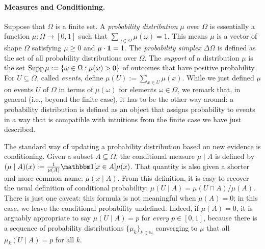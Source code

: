 \paragraph{Measures and Conditioning.}
Suppose that $\Omega$ is a finite set. 
A \emph{probability distribution} $\mu$ over $\Omega$ is essentially a function 
$\mu : \Omega \to [0,1]$ such that $\sum_{\omega \in \Omega} \mu(\omega) = 1$.
This means $\mu$ is a vector of shape 
$\Omega$ 
satisfying $\mu \ge 0$ and $\mu \cdot \mathbf 1 = 1$. 
The \emph{probability simplex} $\Delta \Omega$ is defined as the set of all probability distributions over $\Omega$. 
The \emph{support} of a distribution $\mu$
    is the set $\operatorname{\mathrm{Supp}} \mu := \{ \omega \in \Omega : \mu(\omega) > 0 \}$
    of outcomes that have positive probability.
For $U \subseteq \Omega$, called \emph{events},
    define $\mu(U) := \sum_{x \in U} \mu(x)$. 
While we just defined $\mu$ on events $U$ of $\Omega$ in terms of $\mu(\omega)$ for elements $\omega \in \Omega$, we remark that, in general (i.e., beyond the finite case), it has to be the other way around: 
a probability distribution is defined as an object that assigns probability to events in a way that is compatible with intuitions from the finite case we have just described.


The standard way of updating a probability distribution based on new evidence is conditioning.
Given a subset $A \subseteq \Omega$, the conditional measure
$\mu \mid A$ is defined by
$(\mu \mid A)(x) := \frac{1}{\mu(A)} \mathbbm 1[x \in A] \mu(x)$.
That quantity is also given a shorter and more common name: $\mu(x \mid A)$. 
From this definition, it is easy to recover the usual definition of conditional probability:
$\mu(U \mid A) = \mu(U \cap A) / \mu(A)$. 
There is just one caveat: this formula is not meaningful when $\mu(A) = 0$; in this case, we leave the conditional probability undefined.
Indeed, if $\mu(A) = 0$, it is arguably appropriate to say $\mu(U \mid A) = p$ for \emph{every} $p\in[0,1]$, because there is a sequence of probability distributions $\{ \mu_k \}_{k \in \mathbb N}$ converging to $\mu$ that all $\mu_k(U \mid A) = p$ for all $k$. 

